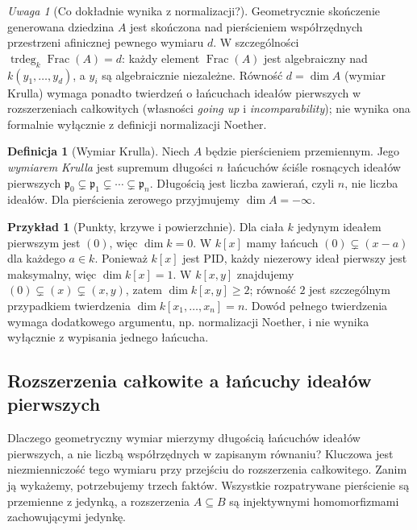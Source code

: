 \documentclass[11pt,a4paper,openany]{report}
\numberwithin{equation}{section}
\theoremstyle{plain}
\theoremstyle{definition}
\newtheorem{definicja}[twierdzenie]{Definicja}
\newtheorem{przyklad}[twierdzenie]{Przykład}
\theoremstyle{remark}
\newtheorem{uwaga}[twierdzenie]{Uwaga}
\newcommand{\Frac}{\operatorname{Frac}}
\begin{document}
\begin{uwaga}[Co dokładnie wynika z normalizacji?]
Geometrycznie skończenie generowana dziedzina
$A$ jest skończona nad pierścieniem współrzędnych
przestrzeni afinicznej pewnego wymiaru $d$.
W szczególności $\operatorname{trdeg}_k\Frac(A)=d$:
każdy element $\Frac(A)$ jest algebraiczny nad
$k(y_1,\ldots,y_d)$, a $y_i$ są algebraicznie
niezależne. Równość $d=\dim A$ (wymiar Krulla)
wymaga ponadto twierdzeń o łańcuchach ideałów
pierwszych w rozszerzeniach całkowitych
(własności \emph{going up} i \emph{incomparability});
nie wynika ona formalnie wyłącznie z definicji
normalizacji Noether.
\end{uwaga}


\begin{definicja}[Wymiar Krulla]
Niech $A$ będzie pierścieniem przemiennym.
Jego \emph{wymiarem Krulla} jest supremum długości
$n$ łańcuchów ściśle rosnących ideałów pierwszych
$\mathfrak p_0\subsetneq\mathfrak p_1\subsetneq
\cdots\subsetneq\mathfrak p_n$. Długością jest
liczba zawierań, czyli $n$, nie liczba ideałów.
Dla pierścienia zerowego przyjmujemy $\dim A=-\infty$.
\end{definicja}

\begin{przyklad}[Punkty, krzywe i powierzchnie]
Dla ciała $k$ jedynym ideałem pierwszym jest $(0)$,
więc $\dim k=0$. W $k[x]$ mamy łańcuch
$(0)\subsetneq(x-a)$ dla każdego $a\in k$.
Ponieważ $k[x]$ jest PID, każdy niezerowy ideał
pierwszy jest maksymalny, więc $\dim k[x]=1$.
W $k[x,y]$ znajdujemy
$(0)\subsetneq(x)\subsetneq(x,y)$, zatem
$\dim k[x,y]\ge2$; równość $2$ jest szczególnym
przypadkiem twierdzenia $\dim k[x_1,\ldots,x_n]=n$.
Dowód pełnego twierdzenia wymaga dodatkowego
argumentu, np. normalizacji Noether, i nie wynika
wyłącznie z wypisania jednego łańcucha.
\end{przyklad}

\subsection{Rozszerzenia całkowite a łańcuchy ideałów pierwszych}
\label{subsec:going-up}
Dlaczego geometryczny wymiar mierzymy długością łańcuchów
ideałów pierwszych, a nie liczbą współrzędnych w
zapisanym równaniu? Kluczowa jest niezmienniczość
tego wymiaru przy przejściu do rozszerzenia
całkowitego. Zanim ją wykażemy, potrzebujemy
trzech faktów. Wszystkie rozpatrywane pierścienie
są przemienne z jedynką, a rozszerzenia $A\subseteq B$
są injektywnymi homomorfizmami zachowującymi jedynkę.
\end{document}
